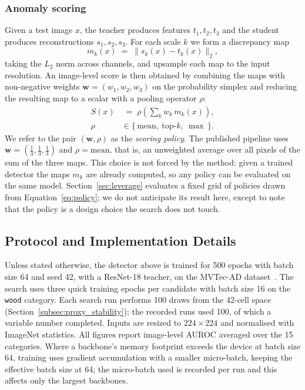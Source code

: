 \subsubsection*{Anomaly scoring}
\label{subsubsec:scoring}
Given a test image $x$, the teacher produces features $t_1, t_2, t_3$ and the
student produces reconstructions $s_1, s_2, s_3$. For each scale $k$ we form a
discrepancy map
%
\begin{equation}
\label{eq:diffmap}
m_k(x) \;=\; \bigl\| s_k(x) - t_k(x) \bigr\|_2 ,
\end{equation}
%
taking the $L_2$ norm across channels, and upsample each map to the input
resolution. An image-level score is then obtained by combining the maps with
non-negative weights $\mathbf{w} = (w_1, w_2, w_3)$ on the probability simplex and
reducing the resulting map to a scalar with a pooling operator $\rho$:
%
\begin{equation}
\label{eq:policy}
\begin{aligned}
S(x) &\;=\; \rho\!\left( \textstyle\sum_{k} w_k \, m_k(x) \right), \\
\rho &\in \{\,\text{mean},\ \text{top-}k,\ \max\,\}.
\end{aligned}
\end{equation}
%
We refer to the pair $(\mathbf{w}, \rho)$ as the \emph{scoring policy}. The
published pipeline uses $\mathbf{w} = (\tfrac13,\tfrac13,\tfrac13)$ and
$\rho = \text{mean}$, that is, an unweighted average over all pixels of the sum of
the three maps. This choice is not forced by the method: given a trained detector
the maps $m_k$ are already computed, so any policy can be evaluated on the same
model. Section~\ref{sec:leverage} evaluates a fixed grid of policies drawn from
Equation~\eqref{eq:policy}; we do not anticipate its result here, except to note
that the policy is a design choice the search does not touch.
\subsection{Protocol and Implementation Details}
\label{subsec:implementation}

Unless stated otherwise, the detector above is trained for 500 epochs with batch
size 64 and seed 42, with a ResNet-18 teacher, on the MVTec-AD
dataset~\cite{bergmann2021mvtec}. The search uses three quick training epochs per
candidate with batch size 16 on the \texttt{wood} category. Each search run
performs 100 draws from the 42-cell space (Section~\ref{subsec:proxy_stability});
the recorded runs used 100, of which a variable number completed. Inputs are resized to $224\times224$ and normalised with ImageNet
statistics. All figures report image-level AUROC averaged over the 15 categories.
Where a backbone's memory footprint exceeds the device at batch size 64, training
uses gradient accumulation with a smaller micro-batch, keeping the effective batch
size at 64; the micro-batch used is recorded per run and this affects only the
largest backbones.

